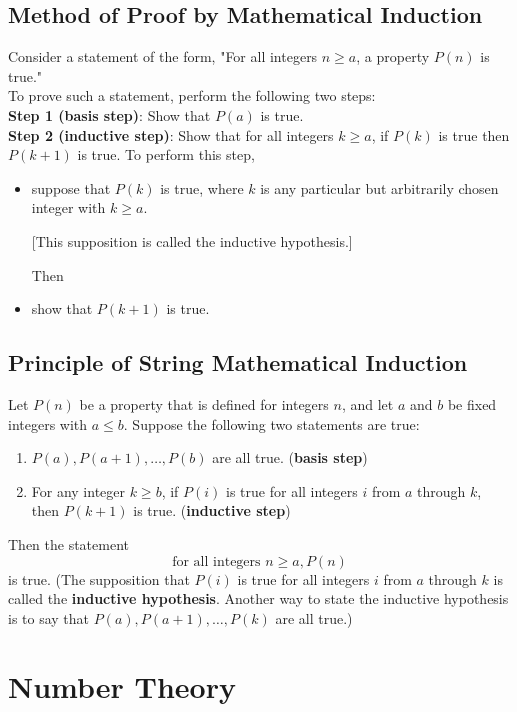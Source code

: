 \documentclass[12pt]{article}
\begin{document}
\subsection{Method of Proof by Mathematical Induction}
Consider a statement of the form, "For all integers $n \geq a$, a property $P(n)$ is true."\\
To prove such a statement, perform the following two steps:\\
\textbf{Step 1 (basis step)}: Show that $P(a)$ is true.\\
\textbf{Step 2 (inductive step)}: Show that for all integers $k \geq a$, if $P(k)$ is true then
$P(k + 1)$ is true. To perform this step,
\begin{itemize}
\item suppose that $P(k)$ is true, where $k$ is any particular but arbitrarily chosen integer with $k \geq a$.
\item[] [This supposition is called the inductive hypothesis.]
\item[] Then
\item show that $P(k + 1)$ is true.
\end{itemize}
\subsection{Principle of String Mathematical Induction}
Let $P(n)$ be a property that is defined for integers $n$, and let $a$ and $b$ be fixed integers
with $a \leq b$. Suppose the following two statements are true:
\begin{enumerate}
\item $P(a), P(a + 1),\ldots, P(b)$ are all true. (\textbf{basis step})
\item For any integer $k \geq b$, if $P(i)$ is true for all integers $i$ from $a$ through $k$, then
$P(k + 1)$ is true. (\textbf{inductive step})
\end{enumerate}
Then the statement
\[\text{for all integers } n \geq a, P(n)\]
is true. (The supposition that $P(i)$ is true for all integers $i$ from $a$ through $k$ is called
the \textbf{inductive hypothesis}. Another way to state the inductive hypothesis is to say
that $P(a), P(a + 1),\ldots, P(k)$ are all true.)
\section{Number Theory}
\end{document}

